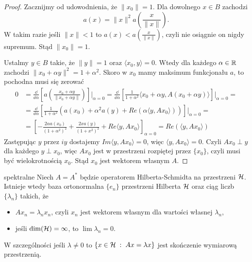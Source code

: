 \begin{proof}
  Zacznijmy od udowodnienia, że $\|x_0\|=1$. Dla dowolnego $x\in B$ zachodzi
  $$a(x)=\|x\|^2a(\frac{x}{\|x\|}).$$
  W takim razie jeśli $\|x\|<1$ to $a(x)<a(\frac{x}{\|x\|})$, czyli nie osiągnie on nigdy supremum. Stąd $\|x_0\|=1$.

  Ustalmy $y\in B$ takie, że $\|y\|=1$ oraz $\langle x_0,y\rangle=0$. Wtedy dla każdego $\alpha\in\mathbb{R}$ zachodzi $\|x_0+\alpha y\|^2=1+\alpha^2$. Skoro w $x_0$ mamy maksimum funkcjonału $a$, to pochodna musi się zerować 
  \begin{align*}
    0&=\frac{\dd}{\dd\alpha}\left[a\left(\frac{x_0+\alpha y}{\|x_0+\alpha y\|}\right)\right]\Big|_{\alpha=0}=\frac{\dd}{\dd\alpha}\left[\frac{1}{1+\alpha^2}\langle x_0+\alpha y, A(x_0+\alpha y)\rangle\right]\Big|_{\alpha=0}=\\ 
     &=\frac{\dd}{\dd\alpha}\left[\frac{1}{1+\alpha^2}(a(x_0)+\alpha^2a(y)+ Re(\alpha\langle y, Ax_0\rangle))\right]\Big|_{\alpha=0}=\\ 
     &=\left[-\frac{2\alpha a(x_0)}{(1+\alpha^2)^2}+\frac{2xa(y)}{(1+x^2)^2}+Re\langle y, Ax_0\rangle \right]_{\alpha=0}=Re(\langle y, Ax_0\rangle)
  \end{align*}
  Zastępując $y$ przez $iy$ dostajemy $Im\langle y, Ax_0\rangle=0$, więc $\langle y, Ax_0\rangle=0$. Czyli $Ax_0\perp y$ dla każdego $y\perp x_0$, więc $Ax_0$ jest w przestrzeni rozpiętej przez $\{x_0\}$, czyli musi być wielokrotnością $x_0$. Stąd $x_0$ jest wektorem własnym $A$.
\end{proof}

\begin{theorem}{spektralne}{}
  Niech $A=A^*$ będzie operatorem Hilberta-Schmidta na przestrzeni $\operatorname{\mathcal{H}}$. Istnieje wtedy baza ortonormalna $\{e_n\}$ przestrzeni Hilberta $\operatorname{\mathcal{H}}$ oraz ciąg liczb $\{\lambda_n\}$ takich, że
  \begin{itemize}
    \item $Ax_n=\lambda_nx_n$, czyli $x_n$ jest wektorem własnym dla wartości własnej $\lambda_n$,
    \item jeśli $\dim(\operatorname{\mathcal{H}})=\infty$, to $\lim\lambda_n=0$.
  \end{itemize}
\end{theorem}
  W szczególności jeśli $\lambda\neq 0$ to $\{x\in\operatorname{\mathcal{H}}\;:\;Ax=\lambda x\}$ jest skończenie wymiarową przestrzenią.

